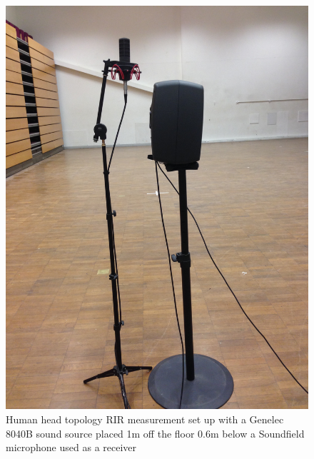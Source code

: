 \documentclass[../../main.tex]{subfiles}
\begin{document}
		\begin{figure}[ht]
			\begin{center}
				\includegraphics[scale = 0.06]{Sections/Implementation/RealRIRs/images/realRIRTopology1.jpg} 
				\caption{Human head topology \ac{RIR} measurement set up with a Genelec 8040B sound source placed 1m off the floor 0.6m below a Soundfield microphone used as a receiver}
				\label{realRIRTop}
			\end{center}
		\end{figure}
\end{document}
